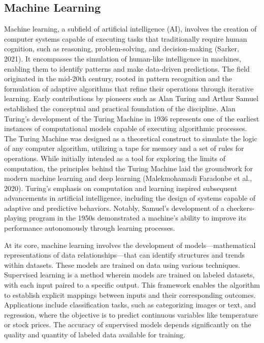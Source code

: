 \documentclass[
  letterpaper,
  11pt,
  english,
  singlespacing,
  headsepline]{MastersDoctoralThesis}
\begin{document}
\begin{spacing}{1.5}
\subsection{Machine Learning}\label{machine-learning}

Machine learning, a subfield of artificial intelligence (AI), involves
the creation of computer systems capable of executing tasks that
traditionally require human cognition, such as reasoning,
problem-solving, and decision-making (Sarker, 2021). It encompasses the
simulation of human-like intelligence in machines, enabling them to
identify patterns and make data-driven predictions. The field originated
in the mid-20th century, rooted in pattern recognition and the
formulation of adaptive algorithms that refine their operations through
iterative learning. Early contributions by pioneers such as Alan Turing
and Arthur Samuel established the conceptual and practical foundation of
the discipline. Alan Turing's development of the Turing Machine in 1936
represents one of the earliest instances of computational models capable
of executing algorithmic processes. The Turing Machine was designed as a
theoretical construct to simulate the logic of any computer algorithm,
utilizing a tape for memory and a set of rules for operations. While
initially intended as a tool for exploring the limits of computation,
the principles behind the Turing Machine laid the groundwork for modern
machine learning and deep learning (Malekmohamadi Faradonbe et al.,
2020). Turing's emphasis on computation and learning inspired subsequent
advancements in artificial intelligence, including the design of systems
capable of adaptive and predictive behaviors. Notably, Samuel's
development of a checkers-playing program in the 1950s demonstrated a
machine's ability to improve its performance autonomously through
learning processes.

At its core, machine learning involves the development of
models---mathematical representations of data relationships---that can
identify structures and trends within datasets. These models are trained
on data using various techniques. Supervised learning is a method
wherein models are trained on labeled datasets, with each input paired
to a specific output. This framework enables the algorithm to establish
explicit mappings between inputs and their corresponding outcomes.
Applications include classification tasks, such as categorizing images
or text, and regression, where the objective is to predict continuous
variables like temperature or stock prices. The accuracy of supervised
models depends significantly on the quality and quantity of labeled data
available for training.


\end{spacing}
\end{document}
